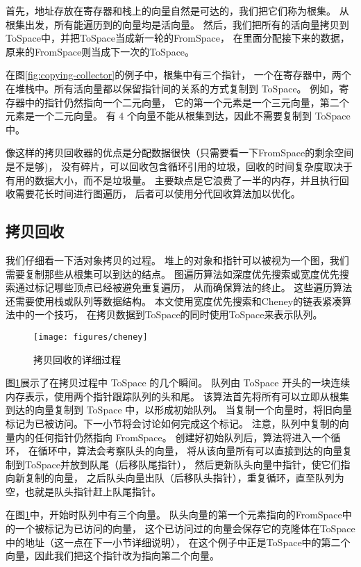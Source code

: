 首先，地址存放在寄存器和栈上的向量自然是可达的，我们把它们称为根集。
从根集出发，所有能遍历到的向量均是活向量。
然后，我们把所有的活向量拷贝到ToSpace中，并把ToSpace当成新一轮的FromSpace，
在里面分配接下来的数据，原来的FromSpace则当成下一次的ToSpace。

在图\ref{fig:copying-collector}的例子中，根集中有三个指针，
一个在寄存器中，两个在堆栈中。所有活向量都以保留指针间的关系的方式复制到 ToSpace。
例如，寄存器中的指针仍然指向一个二元向量，
它的第一个元素是一个三元向量，第二个元素是一个二元向量。
有 4 个向量不能从根集到达，因此不需要复制到 ToSpace 中。

像这样的拷贝回收器的优点是分配数据很快（只需要看一下FromSpace的剩余空间是不是够)，
没有碎片，可以回收包含循环引用的垃圾，回收的时间复杂度取决于有用的数据大小，而不是垃圾量。
主要缺点是它浪费了一半的内存，并且执行回收需要花长时间进行图遍历，
后者可以使用分代回收算法加以优化。


\subsection{拷贝回收}

我们仔细看一下活对象拷贝的过程。
堆上的对象和指针可以被视为一个图，我们需要复制那些从根集可以到达的结点。
图遍历算法如深度优先搜索或宽度优先搜索通过标记哪些顶点已经被避免重复遍历，
从而确保算法的终止。
这些遍历算法还需要使用栈或队列等数据结构。
本文使用宽度优先搜索和Cheney\cite{Cheney_1970}的链表紧凑算法中的一个技巧，
在拷贝数据到ToSpace的同时使用ToSpace来表示队列。

\begin{figure}[tbp]
\centering
\texttt{[image: figures/cheney]}
\caption{拷贝回收的详细过程}
\label{fig:cheney}
\end{figure}

图\ref{fig:cheney}展示了在拷贝过程中 ToSpace 的几个瞬间。
队列由 ToSpace 开头的一块连续内存表示，使用两个指针跟踪队列的头和尾。
该算法首先将所有可以立即从根集到达的向量复制到 ToSpace 中，以形成初始队列。
当复制一个向量时，将旧向量标记为已被访问。下一小节将会讨论如何完成这个标记。
注意，队列中复制的向量内的任何指针仍然指向 FromSpace。
创建好初始队列后，算法将进入一个循环，
在循环中，算法会考察队头的向量，
将从该向量所有可以直接到达的向量复制到ToSpace并放到队尾（后移队尾指针），
然后更新队头向量中指针，使它们指向新复制的向量，
之后队头向量出队（后移队头指针），重复循环，直至队列为空，也就是队头指针赶上队尾指针。

在图\ref{fig:cheney}中，开始时队列中有三个向量。
队头向量的第一个元素指向的FromSpace中的一个被标记为已访问的向量，
这个已访问过的向量会保存它的克隆体在ToSpace中的地址（这一点在下一小节详细说明），
在这个例子中正是ToSpace中的第二个向量，因此我们把这个指针改为指向第二个向量。

